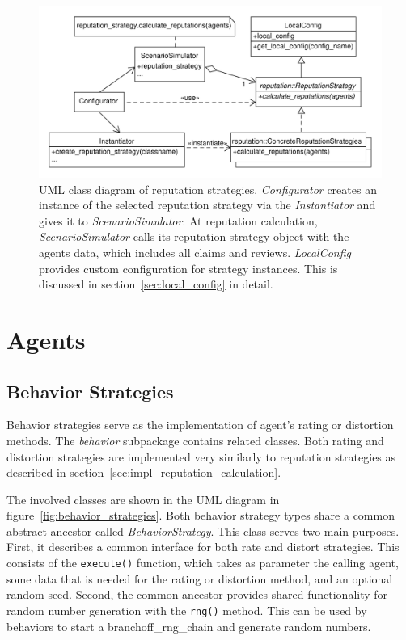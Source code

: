 \documentclass[%
    ]{\PathToTumTemplate/thesis/tum_thesis}
\begin{document}
\begin{figure}[tbp]
  \begin{center}
        \includegraphics[width=1\linewidth]	{../uml/reputation_strategy.pdf}
    \caption{
	UML class diagram of reputation strategies.
	\emph{Configurator} creates an instance of the selected reputation strategy via the \emph{Instantiator} and gives it to \emph{ScenarioSimulator}.
	At reputation calculation, \emph{ScenarioSimulator} calls its reputation strategy object with the agents data, which includes all claims and reviews.
	\emph{LocalConfig} provides custom configuration for strategy instances.
	This is discussed in section~\ref{sec:local_config} in detail.
    }
    \label{fig:reputation_strategy}
  \end{center}
\end{figure}



\section{Agents}\label{sec:impl_agent}

\subsection{Behavior Strategies}
Behavior strategies serve as the implementation of agent's rating or distortion methods.
The \emph{behavior} subpackage contains related classes.
Both rating and distortion strategies are implemented very similarly to reputation strategies as described in section~\ref{sec:impl_reputation_calculation}.

The involved classes are shown in the UML diagram in figure~\ref{fig:behavior_strategies}.
Both behavior strategy types share a common abstract ancestor called \emph{BehaviorStrategy}.
This class serves two main purposes.
First, it describes a common interface for both rate and distort strategies.
This consists of the \lstinline{execute()} function, which takes as parameter the calling agent, some data that is needed for the rating or distortion method, and an optional random seed.
Second, the common ancestor provides shared functionality for random number generation with the \lstinline{rng()} method.
This can be used by behaviors to start a \gls{branchoff_rng_chain} and generate random numbers.
\end{document}
